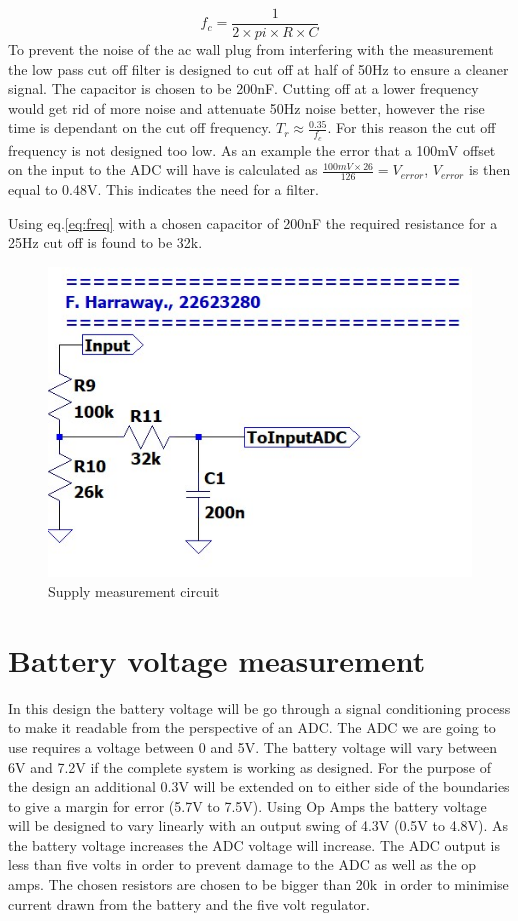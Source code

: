 \begin{equation}
f_c=\frac{1}{2\times pi\times R\times C}
\label{eq:freq}
\end{equation}
To prevent the noise of the ac wall plug from interfering with the measurement the low pass cut off filter is designed to cut off at half of 50Hz to ensure a cleaner signal. The capacitor is chosen to be 200nF. Cutting off at a lower frequency would get rid of more noise  and attenuate 50Hz noise better, however the rise time is dependant on the cut off frequency. $T_r \approx \frac{0.35}{f_c}$. For this reason the cut off frequency is not designed too low.  As an example the error that a 100mV offset on the input to the ADC will have is calculated as $\frac{100mV\times 26}{126}= V_{error}$, $V_{error}$ is then equal to 0.48V. This indicates the need for a filter.

Using eq.\ref{eq:freq} with a chosen capacitor of 200nF the required resistance for a 25Hz cut off is found to be 32k\textohm.

\begin{figure}[!htb]
	\centering
	\includegraphics[width=0.26\linewidth]{Figures/A6/Supsig.jpg}
	\caption{Supply measurement circuit}
	\label{fig:supcirc}
\end{figure}


\newpage

\section{Battery voltage measurement}
In this design the battery voltage will be go through a signal conditioning process to make it readable from the perspective of an ADC. The ADC we are going to use requires a voltage between 0 and 5V. The battery voltage will vary between 6V and 7.2V if the complete system is working as designed. For the purpose of the design an additional 0.3V will be extended on to either side of the boundaries to give a margin for error (5.7V to 7.5V).  Using Op Amps the battery voltage will be designed to vary linearly with an output swing of 4.3V (0.5V to 4.8V). As the battery voltage increases the ADC voltage will increase. The ADC output is less than five volts in order to prevent damage to the ADC as well as the op amps. The chosen resistors are chosen to be bigger than 20k\textohm \ in order to minimise current drawn from the battery and the five volt regulator. 

